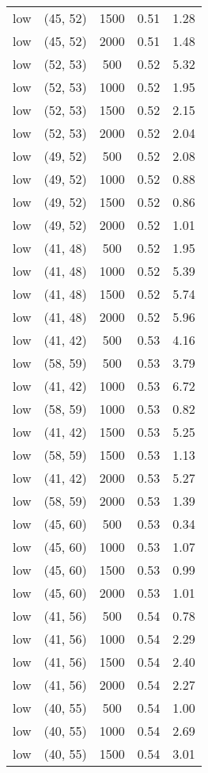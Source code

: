 \begin{tabular}{c c c c c}
low & (45, 52) &  1500 & 0.51 & 1.28 \\
low & (45, 52) &  2000 & 0.51 & 1.48 \\
low & (52, 53) &  500 & 0.52 & 5.32 \\
low & (52, 53) &  1000 & 0.52 & 1.95 \\
low & (52, 53) &  1500 & 0.52 & 2.15 \\
low & (52, 53) &  2000 & 0.52 & 2.04 \\
low & (49, 52) &  500 & 0.52 & 2.08 \\
low & (49, 52) &  1000 & 0.52 & 0.88 \\
low & (49, 52) &  1500 & 0.52 & 0.86 \\
low & (49, 52) &  2000 & 0.52 & 1.01 \\
low & (41, 48) &  500 & 0.52 & 1.95 \\
low & (41, 48) &  1000 & 0.52 & 5.39 \\
low & (41, 48) &  1500 & 0.52 & 5.74 \\
low & (41, 48) &  2000 & 0.52 & 5.96 \\
low & (41, 42) &  500 & 0.53 & 4.16 \\
low & (58, 59) &  500 & 0.53 & 3.79 \\
low & (41, 42) &  1000 & 0.53 & 6.72 \\
low & (58, 59) &  1000 & 0.53 & 0.82 \\
low & (41, 42) &  1500 & 0.53 & 5.25 \\
low & (58, 59) &  1500 & 0.53 & 1.13 \\
low & (41, 42) &  2000 & 0.53 & 5.27 \\
low & (58, 59) &  2000 & 0.53 & 1.39 \\
low & (45, 60) &  500 & 0.53 & 0.34 \\
low & (45, 60) &  1000 & 0.53 & 1.07 \\
low & (45, 60) &  1500 & 0.53 & 0.99 \\
low & (45, 60) &  2000 & 0.53 & 1.01 \\
low & (41, 56) &  500 & 0.54 & 0.78 \\
low & (41, 56) &  1000 & 0.54 & 2.29 \\
low & (41, 56) &  1500 & 0.54 & 2.40 \\
low & (41, 56) &  2000 & 0.54 & 2.27 \\
low & (40, 55) &  500 & 0.54 & 1.00 \\
low & (40, 55) &  1000 & 0.54 & 2.69 \\
low & (40, 55) &  1500 & 0.54 & 3.01 \\

\end{tabular}
